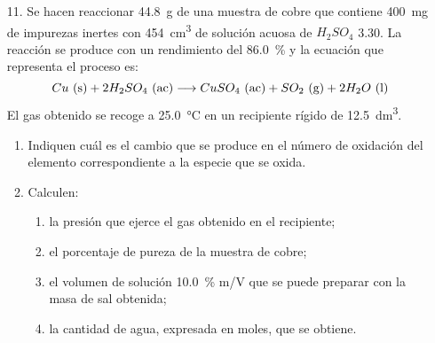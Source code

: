 \documentclass[../Práctica.root.tex]{subfiles}
\begin{document}
\begin{enumerate}
    \item[11.] Se hacen reaccionar \SI{44,8}{\g} de una muestra de cobre que contiene \SI{400}{\mg} de impurezas
          inertes con \SI{454}{\cm\cubed} de solución acuosa de $H_2SO_4$ \SI{3,30}{\MR}. La reacción se produce con un
          rendimiento del \SI{86,0}{\percent} y la ecuación que representa el proceso es:
          \[ Cu \ \text{(s)} + 2 H_2SO_4 \ \text{(ac)} \longrightarrow{} CuSO_4 \ \text{(ac)} + SO_2 \ \text{(g)} + 2 H_2O \ \text{(l)} \]
          El gas obtenido se recoge a \SI{25,0}{\celsius} en un recipiente rígido de \SI{12,5}{\dm\cubed}.
          \begin{enumerate}
              \item Indiquen cuál es el cambio que se produce en el número de oxidación del elemento
                    correspondiente a la especie que se oxida.
              \item Calculen:
                    \begin{enumerate}
                        \item la presión que ejerce el gas obtenido en el recipiente;
                        \item el porcentaje de pureza de la muestra de cobre;
                        \item el volumen de solución \SI{10,0}{\percent} m/V que se puede preparar con la masa de sal obtenida;
                        \item la cantidad de agua, expresada en moles, que se obtiene.
                    \end{enumerate}
          \end{enumerate}


\end{enumerate}
\end{document}
